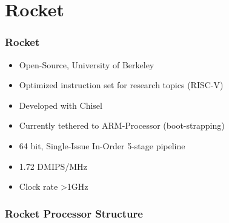 \documentclass{beamer}
\begin{document}
\section{Rocket}
\begin{frame}
	\frametitle{Rocket}
	\begin{itemize}
		\item Open-Source, University of Berkeley
		\item Optimized instruction set for research topics (RISC-V)
		\item Developed with Chisel
		\item Currently tethered to ARM-Processor (boot-strapping)
		\item 64 bit, Single-Issue In-Order 5-stage pipeline
		\item 1.72 DMIPS/MHz
		 \item Clock rate \textgreater 1GHz
	\end{itemize}
\end{frame}

\begin{frame}
	\frametitle{Rocket Processor Structure}
	\begin{figure}[!h]
	\begin{center}
	\end{center}
	\end{figure}
\end{frame}
\end{document}
